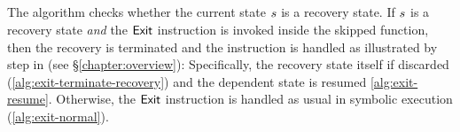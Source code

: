 \subsection{}

The algorithm checks whether the current state $s$ is a
recovery state. If $s$ is a recovery state \emph{and} the
$\mathsf{Exit}$ instruction is invoked inside the skipped function,
then the recovery is terminated and the instruction is handled as
illustrated by step  in  (see
\S\ref{chapter:overview}): Specifically, the recovery state itself if
discarded (\cref{alg:exit-terminate-recovery}) and the dependent state
is resumed \cref{alg:exit-resume}. Otherwise, the $\mathsf{Exit}$
instruction is handled as usual in symbolic execution
(\cref{alg:exit-normal}).



